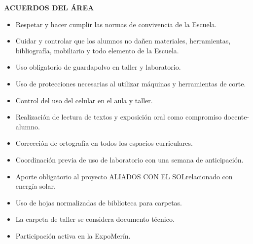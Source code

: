 \documentclass[a4paper,12pt]{article}
\begin{document}
\vspace{0.5cm}

\begin{center}
  \fontsize{12pt}{14pt}\selectfont \textbf{\uppercase{ACUERDOS DEL ÁREA}}
\end{center}
\begin{itemize}[leftmargin=*, itemsep=0pt, parsep=0pt]
  \item Respetar y hacer cumplir las normas de convivencia de la Escuela.
  \item Cuidar y controlar que los alumnos no dañen materiales,
    herramientas, bibliografía, mobiliario y todo elemento de la Escuela.
  \item Uso obligatorio de guardapolvo en taller y laboratorio.
  \item Uso de protecciones necesarias al utilizar máquinas y
    herramientas de corte.
  \item Control del uso del celular en el aula y taller.
  \item Realización de lectura de textos y exposición oral como
    compromiso docente-alumno.
  \item Corrección de ortografía en todos los espacios curriculares.
  \item Coordinación previa de uso de laboratorio con una semana de
    anticipación.
  \item Aporte obligatorio al proyecto \textquotedbl ALIADOS CON EL
    SOL\textquotedbl relacionado con energía solar.
  \item Uso de hojas normalizadas de biblioteca para carpetas.
  \item La carpeta de taller se considera documento técnico.
  \item Participación activa en la ExpoMerín.
\end{itemize}
\end{document}

